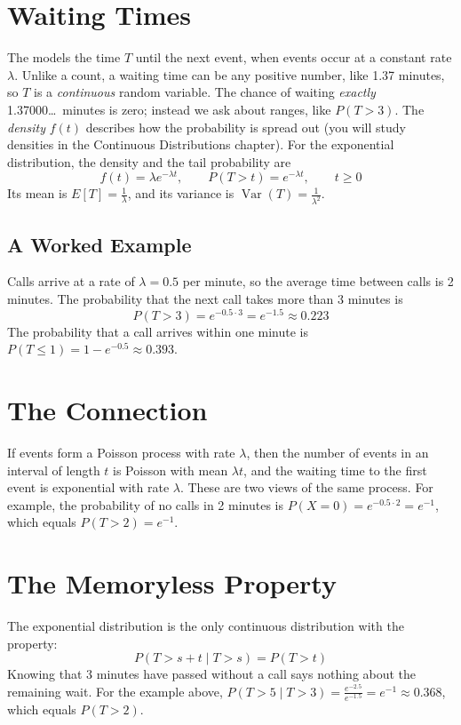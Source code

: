 \section{Waiting Times}
The  models the time $T$ until the next event, when events occur at a constant rate $\lambda$.
Unlike a count, a waiting time can be any positive number, like 1.37
minutes, so $T$ is a \emph{continuous} random variable. The chance of
waiting \emph{exactly} 1.37000\ldots\ minutes is zero; instead we ask about
ranges, like $P(T > 3)$. The \emph{density} $f(t)$ describes how the
probability is spread out (you will study densities in the Continuous
Distributions chapter). For the exponential distribution, the density and the tail probability are
$$f(t) = \lambda e^{-\lambda t}, \qquad P(T > t) = e^{-\lambda t}, \qquad t \ge 0$$
Its mean is $E[T] = \frac{1}{\lambda}$, and its variance is $\operatorname{Var}(T) = \frac{1}{\lambda^2}$.

\subsection{A Worked Example}
Calls arrive at a rate of $\lambda = 0.5$ per minute, so the average time between calls is 2 minutes. The probability that the next
call takes more than 3 minutes is
$$P(T > 3) = e^{-0.5 \cdot 3} = e^{-1.5} \approx 0.223$$
The probability that a call arrives within one minute is $P(T \le 1) = 1 - e^{-0.5} \approx 0.393$.

\section{The Connection}
If events form a Poisson process with rate $\lambda$, then the number of events in an interval of length $t$ is Poisson with mean
$\lambda t$, and the waiting time to the first event is exponential with rate $\lambda$. These are two views of the same process.
For example, the probability of no calls in 2 minutes is
$P(X = 0) = e^{-0.5 \cdot 2} = e^{-1}$, which equals $P(T > 2) = e^{-1}$.

\section{The Memoryless Property}
The exponential distribution is the only continuous distribution with the  property:
$$P(T > s + t \mid T > s) = P(T > t)$$
Knowing that 3 minutes have passed without a call says nothing about the remaining wait. For the example above,
$P(T > 5 \mid T > 3) = \frac{e^{-2.5}}{e^{-1.5}} = e^{-1} \approx 0.368$, which equals $P(T > 2)$.

